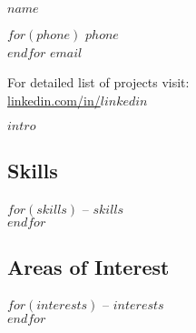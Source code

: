 \documentclass[$fontsize$, a4paper]{article}
\begin{document}
{\LARGE $name$}\\[.2cm]



\begin{multicols}{2}

$for(phone)$
$phone$\\
$endfor$
\href{mailto:$email$}{$email$}\\

\columnbreak

For detailed list of projects visit:\\
\href{http://linkedin.com/in/$linkedin$}{linkedin.com/in/$linkedin$}

\end{multicols}

\vspace{10pt}




$intro$

\vspace{5pt}


\begin{multicols}{2}

\subsection*{Skills}
$for(skills)$
-- $skills$\\
$endfor$

\columnbreak

\subsection*{Areas of Interest}
$for(interests)$
-- $interests$\\
$endfor$

\end{multicols}


\end{document}
